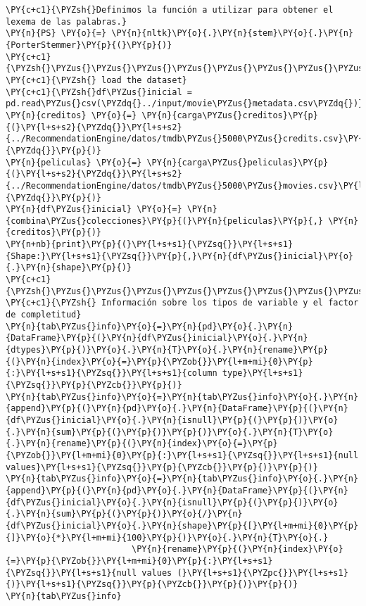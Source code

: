 \begin{tcolorbox}[breakable, size=fbox, boxrule=1pt, pad at break*=1mm,colback=cellbackground, colframe=cellborder]
\begin{Verbatim}[commandchars=\\\{\}]
\PY{c+c1}{\PYZsh{}Definimos la función a utilizar para obtener el lexema de las palabras.}
\PY{n}{PS} \PY{o}{=} \PY{n}{nltk}\PY{o}{.}\PY{n}{stem}\PY{o}{.}\PY{n}{PorterStemmer}\PY{p}{(}\PY{p}{)}
\PY{c+c1}{\PYZsh{}\PYZus{}\PYZus{}\PYZus{}\PYZus{}\PYZus{}\PYZus{}\PYZus{}\PYZus{}\PYZus{}\PYZus{}\PYZus{}\PYZus{}\PYZus{}\PYZus{}\PYZus{}\PYZus{}\PYZus{}\PYZus{}}
\PY{c+c1}{\PYZsh{} load the dataset}
\PY{c+c1}{\PYZsh{}df\PYZus{}inicial = pd.read\PYZus{}csv(\PYZdq{}../input/movie\PYZus{}metadata.csv\PYZdq{})}
\PY{n}{creditos} \PY{o}{=} \PY{n}{carga\PYZus{}creditos}\PY{p}{(}\PY{l+s+s2}{\PYZdq{}}\PY{l+s+s2}{../RecommendationEngine/datos/tmdb\PYZus{}5000\PYZus{}credits.csv}\PY{l+s+s2}{\PYZdq{}}\PY{p}{)}
\PY{n}{peliculas} \PY{o}{=} \PY{n}{carga\PYZus{}peliculas}\PY{p}{(}\PY{l+s+s2}{\PYZdq{}}\PY{l+s+s2}{../RecommendationEngine/datos/tmdb\PYZus{}5000\PYZus{}movies.csv}\PY{l+s+s2}{\PYZdq{}}\PY{p}{)}
\PY{n}{df\PYZus{}inicial} \PY{o}{=} \PY{n}{combina\PYZus{}colecciones}\PY{p}{(}\PY{n}{peliculas}\PY{p}{,} \PY{n}{creditos}\PY{p}{)}
\PY{n+nb}{print}\PY{p}{(}\PY{l+s+s1}{\PYZsq{}}\PY{l+s+s1}{Shape:}\PY{l+s+s1}{\PYZsq{}}\PY{p}{,}\PY{n}{df\PYZus{}inicial}\PY{o}{.}\PY{n}{shape}\PY{p}{)}
\PY{c+c1}{\PYZsh{}\PYZus{}\PYZus{}\PYZus{}\PYZus{}\PYZus{}\PYZus{}\PYZus{}\PYZus{}\PYZus{}\PYZus{}\PYZus{}\PYZus{}\PYZus{}\PYZus{}\PYZus{}\PYZus{}\PYZus{}\PYZus{}\PYZus{}\PYZus{}\PYZus{}\PYZus{}\PYZus{}\PYZus{}\PYZus{}\PYZus{}\PYZus{}\PYZus{}\PYZus{}\PYZus{}\PYZus{}\PYZus{}\PYZus{}\PYZus{}\PYZus{}\PYZus{}\PYZus{}\PYZus{}\PYZus{}\PYZus{}\PYZus{}\PYZus{}}
\PY{c+c1}{\PYZsh{} Información sobre los tipos de variable y el factor de completitud}
\PY{n}{tab\PYZus{}info}\PY{o}{=}\PY{n}{pd}\PY{o}{.}\PY{n}{DataFrame}\PY{p}{(}\PY{n}{df\PYZus{}inicial}\PY{o}{.}\PY{n}{dtypes}\PY{p}{)}\PY{o}{.}\PY{n}{T}\PY{o}{.}\PY{n}{rename}\PY{p}{(}\PY{n}{index}\PY{o}{=}\PY{p}{\PYZob{}}\PY{l+m+mi}{0}\PY{p}{:}\PY{l+s+s1}{\PYZsq{}}\PY{l+s+s1}{column type}\PY{l+s+s1}{\PYZsq{}}\PY{p}{\PYZcb{}}\PY{p}{)}
\PY{n}{tab\PYZus{}info}\PY{o}{=}\PY{n}{tab\PYZus{}info}\PY{o}{.}\PY{n}{append}\PY{p}{(}\PY{n}{pd}\PY{o}{.}\PY{n}{DataFrame}\PY{p}{(}\PY{n}{df\PYZus{}inicial}\PY{o}{.}\PY{n}{isnull}\PY{p}{(}\PY{p}{)}\PY{o}{.}\PY{n}{sum}\PY{p}{(}\PY{p}{)}\PY{p}{)}\PY{o}{.}\PY{n}{T}\PY{o}{.}\PY{n}{rename}\PY{p}{(}\PY{n}{index}\PY{o}{=}\PY{p}{\PYZob{}}\PY{l+m+mi}{0}\PY{p}{:}\PY{l+s+s1}{\PYZsq{}}\PY{l+s+s1}{null values}\PY{l+s+s1}{\PYZsq{}}\PY{p}{\PYZcb{}}\PY{p}{)}\PY{p}{)}
\PY{n}{tab\PYZus{}info}\PY{o}{=}\PY{n}{tab\PYZus{}info}\PY{o}{.}\PY{n}{append}\PY{p}{(}\PY{n}{pd}\PY{o}{.}\PY{n}{DataFrame}\PY{p}{(}\PY{n}{df\PYZus{}inicial}\PY{o}{.}\PY{n}{isnull}\PY{p}{(}\PY{p}{)}\PY{o}{.}\PY{n}{sum}\PY{p}{(}\PY{p}{)}\PY{o}{/}\PY{n}{df\PYZus{}inicial}\PY{o}{.}\PY{n}{shape}\PY{p}{[}\PY{l+m+mi}{0}\PY{p}{]}\PY{o}{*}\PY{l+m+mi}{100}\PY{p}{)}\PY{o}{.}\PY{n}{T}\PY{o}{.}
                         \PY{n}{rename}\PY{p}{(}\PY{n}{index}\PY{o}{=}\PY{p}{\PYZob{}}\PY{l+m+mi}{0}\PY{p}{:}\PY{l+s+s1}{\PYZsq{}}\PY{l+s+s1}{null values (}\PY{l+s+s1}{\PYZpc{}}\PY{l+s+s1}{)}\PY{l+s+s1}{\PYZsq{}}\PY{p}{\PYZcb{}}\PY{p}{)}\PY{p}{)}
\PY{n}{tab\PYZus{}info}
\end{Verbatim}
\end{tcolorbox}

